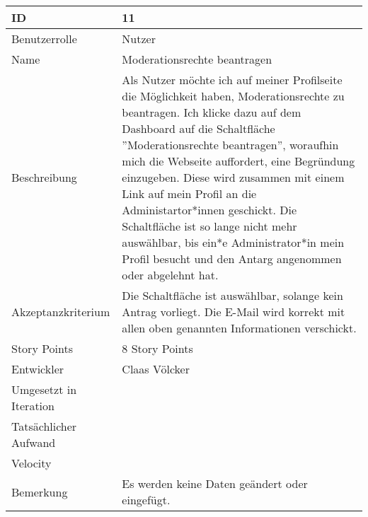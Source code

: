 \begin{tabularx}{\textwidth}{|p{}|X|}
	\hline
	ID & 11\\
	\hline
	Benutzerrolle & Nutzer\\
	\hline
	Name & Moderationsrechte beantragen\\
	\hline
	Beschreibung & Als Nutzer möchte ich auf meiner Profilseite die Möglichkeit haben, Moderationsrechte zu beantragen. Ich klicke dazu auf dem Dashboard auf die Schaltfläche ''Moderationsrechte beantragen'', woraufhin mich die Webseite auffordert, eine Begründung einzugeben. Diese wird zusammen mit einem Link auf mein Profil an die Administartor*innen geschickt. Die Schaltfläche ist so lange nicht mehr auswählbar, bis ein*e Administrator*in mein Profil besucht und den Antarg angenommen oder abgelehnt hat.\\
	\hline
	Akzeptanzkriterium & Die Schaltfläche ist auswählbar, solange kein Antrag vorliegt. Die E-Mail wird korrekt mit allen oben genannten Informationen verschickt.\\
	\hline
	Story Points & 8 Story Points\\
	\hline
	Entwickler & Claas Völcker\\
	\hline
	Umgesetzt in Iteration & \\
	\hline
	Tatsächlicher Aufwand & \\
	\hline
	Velocity & \\
	\hline
	Bemerkung & Es werden keine Daten geändert oder eingefügt.\\
	\hline
\end{tabularx}
\vspace{20pt}
